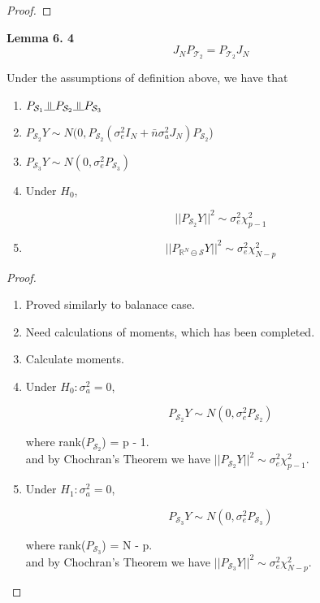 \documentclass[11pt,fleqn]{book} %
\newcommand{\indep}{\rotatebox[origin=c]{90}{$\models$}}
\begin{document}
\begin{proof}
\end{proof}

\textbf{Lemma 6. 4}\\

		$$J_N P_{\mathcal{T}_2} =  P_{\mathcal{T}_2} J_N$$


\begin{theorem}
	Under the assumptions of definition above, we have that
			\begin{enumerate}
				\item $P_{\mathcal{S}_1} \indep P_{\mathcal{S}_2} \indep P_{\mathcal{S}_3}$
				\item $ P_{\mathcal{S}_2} Y \sim N(0, P_{\mathcal{S}_2}(\sigma_e^2 I_N + \bar{n}\sigma^2_a J_N) P_{\mathcal{S}_2}$)
				\item $P_{\mathcal{S}_3}Y \sim N(0, \sigma^2_e P_{\mathcal{S}_3})$
				\item Under $H_0$, 

						$$||P_{\mathcal{S}_2}Y||^2 \sim \sigma_e^2 \chi^2_{p-1}$$
				\item 
						$$||P_{\mathbb{R}^N \ominus \mathcal{S}}Y||^2 \sim \sigma_e^2 \chi^2_{N - p} $$
			\end{enumerate}
\end{theorem}

\begin{proof}
	\begin{enumerate}
		\item Proved similarly to balanace case. 
		\item Need calculations of moments, which has been completed. 
		\item Calculate moments. 
		\item Under $H_0: \sigma_a^2 = 0$, 

				$$P_{\mathcal{S}_2} Y \sim N(0, \sigma_e^2 P_{\mathcal{S}_2}) $$

		where rank($P_{\mathcal{S}_2}$) = p - 1. \\

		and by Chochran's Theorem we have $|| P_{\mathcal{S}_2} Y||^2 \sim \sigma_e^2\chi^2_{p-1}$.\\

		\item Under $H_1: \sigma_a^2 = 0$, 

				$$P_{\mathcal{S}_3} Y \sim N(0, \sigma_e^2 P_{\mathcal{S}_3}) $$

		where rank($P_{\mathcal{S}_3}$) = N - p. \\

		and by Chochran's Theorem we have $|| P_{\mathcal{S}_3} Y||^2 \sim \sigma_e^2\chi^2_{N - p}$.\\
	\end{enumerate}
\end{proof}
		
\end{document}
